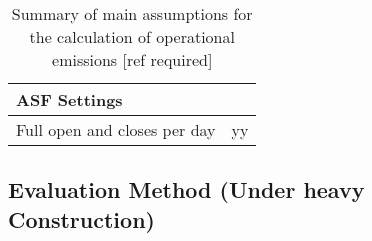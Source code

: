 \begin{table}[H]
\begin{tabular}{ll}
\textbf{ASF Settings}         &                                                \\
\hline
Full open and closes per day  &   yy                                           \\
\hline
\end{tabular}
\caption{Summary of main assumptions for the calculation of operational emissions [ref required]}
\label{tab:AssumptionsOpp}
\end{table}



\subsection{Evaluation Method (Under heavy Construction)}



